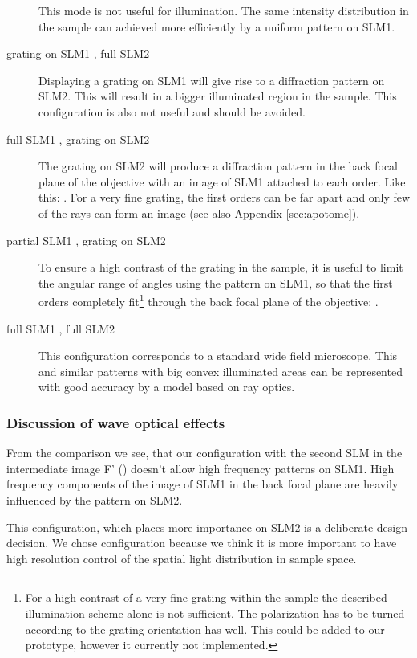 \begin{description}
  This mode is not useful for illumination. The same intensity
  distribution in the sample can achieved more efficiently by a
  uniform pattern on SLM1.
\item[grating on SLM1 \sm{grating-circle}, full SLM2 \sm{full}]
  Displaying a grating on SLM1 will give rise to a diffraction pattern
  on SLM2. This will result in a bigger illuminated region in the
  sample. This configuration is also not useful and should be avoided.
\item[full SLM1 \sm{full}, grating on SLM2 \sm{grating}] The grating
  on SLM2 will produce a diffraction pattern in the back focal plane
  of the objective with an image of SLM1 attached to each order. Like
  this: . For a very fine grating, the first orders can be
  far apart and only few of the rays can form an image (see also
  Appendix \ref{sec:apotome}).
\item[partial SLM1 \sm{half}, grating on SLM2\sm{grating}] To ensure a
  high contrast of the grating in the sample, it is useful to limit
  the angular range of angles using the pattern on SLM1, so that the
  first orders completely fit\footnote{For a high contrast of a very
    fine grating within the sample the described illumination scheme
    alone is not sufficient. The polarization has to be turned
    according to the grating orientation has well. This could be added
    to our prototype, however it currently not implemented.} through
  the back focal plane of the objective: .
\item[full SLM1 \sm{full}, full SLM2 \sm{full}] This configuration
  corresponds to a standard wide field microscope. This and similar
  patterns with big convex illuminated areas can be represented with
  good accuracy by a model based on ray optics.
\end{description}

\subsubsection{Discussion of wave optical effects}
From the comparison we see, that our configuration with the second SLM
in the intermediate image F' () doesn't allow
high frequency patterns on SLM1. High frequency components of the
image of SLM1 in the back focal plane are heavily influenced by the
pattern on SLM2.

This configuration, which places more importance on SLM2 is a
deliberate design decision.  We chose configuration because we think
it is more important to have high resolution control of the spatial
light distribution in sample space.


